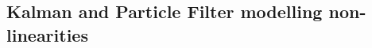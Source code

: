 \documentclass[conference]{IEEEtran}
\begin{document}



\subsection{Kalman and Particle Filter modelling non-linearities} %
\end{document}
